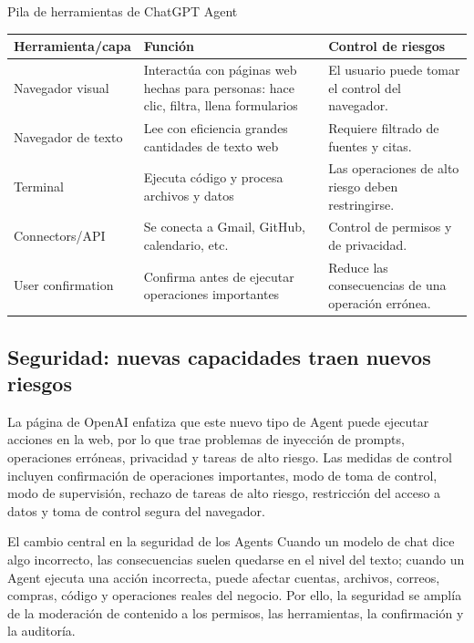 \documentclass[a4paper]{article}
\begin{document}
\begin{knowledgebox}{Pila de herramientas de ChatGPT Agent}
\begin{tabularx}{\textwidth}{p{}p{}X}
\toprule
Herramienta/capa & Función & Control de riesgos \\
\midrule
Navegador visual & Interactúa con páginas web hechas para personas: hace clic, filtra, llena formularios & El usuario puede tomar el control del navegador. \\
Navegador de texto & Lee con eficiencia grandes cantidades de texto web & Requiere filtrado de fuentes y citas. \\
Terminal & Ejecuta código y procesa archivos y datos & Las operaciones de alto riesgo deben restringirse. \\
Connectors/API & Se conecta a Gmail, GitHub, calendario, etc. & Control de permisos y de privacidad. \\
User confirmation & Confirma antes de ejecutar operaciones importantes & Reduce las consecuencias de una operación errónea. \\
\bottomrule
\end{tabularx}
\end{knowledgebox}

\subsection{Seguridad: nuevas capacidades traen nuevos riesgos}

La página de OpenAI enfatiza que este nuevo tipo de Agent puede ejecutar acciones en la web, por lo que trae problemas de inyección de prompts, operaciones erróneas, privacidad y tareas de alto riesgo. Las medidas de control incluyen confirmación de operaciones importantes, modo de toma de control, modo de supervisión, rechazo de tareas de alto riesgo, restricción del acceso a datos y toma de control segura del navegador.

\begin{warningbox}{El cambio central en la seguridad de los Agents}
Cuando un modelo de chat dice algo incorrecto, las consecuencias suelen quedarse en el nivel del texto; cuando un Agent ejecuta una acción incorrecta, puede afectar cuentas, archivos, correos, compras, código y operaciones reales del negocio. Por ello, la seguridad se amplía de la moderación de contenido a los permisos, las herramientas, la confirmación y la auditoría.
\end{warningbox}
\end{document}
